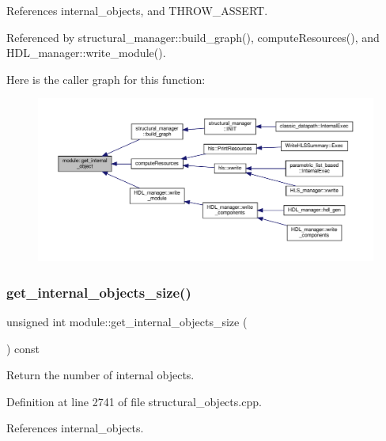 References internal\+\_\+objects, and T\+H\+R\+O\+W\+\_\+\+A\+S\+S\+E\+RT.



Referenced by structural\+\_\+manager\+::build\+\_\+graph(), compute\+Resources(), and H\+D\+L\+\_\+manager\+::write\+\_\+module().

Here is the caller graph for this function\+:
\nopagebreak
\begin{figure}[H]
\begin{center}
\leavevmode
\includegraphics[width=350pt]{d0/dd3/classmodule_af59435e147c07a183bf7c8ab525eb3fd_icgraph}
\end{center}
\end{figure}
\mbox{\label{classmodule_a4ddb109ccb130b31471a7648dbcf5352}} 
\subsubsection{\texorpdfstring{get\+\_\+internal\+\_\+objects\+\_\+size()}{get\_internal\_objects\_size()}}
{\footnotesize\ttfamily unsigned int module\+::get\+\_\+internal\+\_\+objects\+\_\+size (\begin{DoxyParamCaption}{ }\end{DoxyParamCaption}) const}



Return the number of internal objects. 



Definition at line 2741 of file structural\+\_\+objects.\+cpp.



References internal\+\_\+objects.



